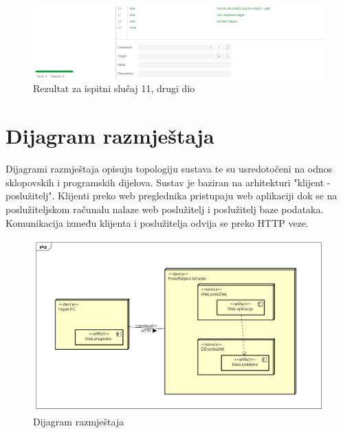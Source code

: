             \begin{figure}[H]
            					\includegraphics[width=\linewidth]{slike/selenium/containermanagement2.png}
            					\centering
            					\caption{Rezultat za ispitni slučaj 11, drugi dio}
            					\label{fig:test 11 p2}
            \end{figure}
			
			\eject 
		
		
		\section{Dijagram razmještaja}
			
			
			
			Dijagrami razmještaja opisuju topologiju sustava te su usredotočeni na odnos sklopovskih i programskih dijelova. Sustav je baziran na arhitekturi "klijent - poslužitelj". Klijenti preko web preglednika pristupaju web aplikaciji dok se na poslužiteljskom računalu nalaze web poslužitelj i poslužitelj baze podataka. Komunikacija između klijenta i poslužitelja odvija se preko HTTP veze.

			\begin{figure} [H]
			    \centering
			    \includegraphics[width=1.0\linewidth]{slike/Deployment_Diagram.png}
                \caption{Dijagram razmještaja}
                \label{fig:Dijagram razmještaja}
		    \end{figure}
			\eject
		

